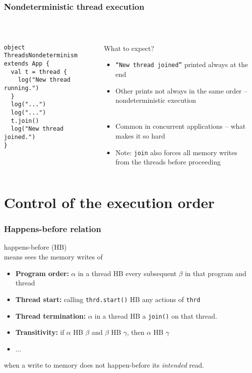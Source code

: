 \documentclass[aspectratio=169]{beamer}
\begin{document}
\begin{frame}[fragile]\frametitle{Nondeterministic thread execution}
~\\[-8mm]
\begin{columns}
\begin{column}{0.49\textwidth}
\begin{lstlisting}[emph={sleep,log,thread,join}]
object ThreadsNondeterminism extends App {
  val t = thread {
    log("New thread running.")
  }
  log("...")
  log("...")
  t.join()
  log("New thread joined.")
}
\end{lstlisting}
\end{column}
\begin{column}{0.49\textwidth}
\begin{block}{What to expect?}
\pause
\begin{itemize}
  \item \texttt{``New thread joined''} printed always at the end
  \item Other prints not always in the same order -- nondeterministic execution
  \\~\pause
  \item Common in concurrent applications -- what makes it so hard
  \item Note: \texttt{join} also forces all memory writes from the threads before proceeding
\end{itemize}
\end{block}
\end{column}
\end{columns}
\end{frame}


\section{Control of the execution order}

\begin{frame}\frametitle{Happens-before relation}
\centering

 \alert{happens-before (HB)} \\
means   sees the memory writes of 

\begin{itemize}
\item \textbf{Program order:} $\alpha$ in a thread \alert{HB} every subsequent $\beta$ in that program and thread
\item \textbf{Thread start:} calling \texttt{thrd.start()} \alert{HB} any actions of \texttt{thrd}
\item \textbf{Thread termination:} $\alpha$ in a thread \alert{HB} a \texttt{join()} on that thread.
\item \textbf{Transitivity:} if $\alpha$ \alert{HB} $\beta$ and $\beta$ \alert{HB} $\gamma$, then $\alpha$ \alert{HB} $\gamma$
\item ...
\end{itemize}

\pause
{} when a write to memory does not \alert{happen-before} its \emph{intended} read.
\end{frame}
\end{document}
